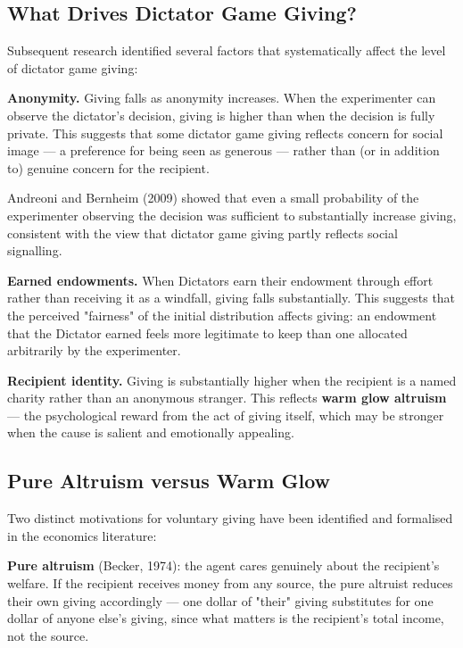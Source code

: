 \documentclass[12pt, letterpaper]{article}
\begin{document}
\newpage
\subsection{What Drives Dictator Game Giving?}


Subsequent research identified several factors that systematically affect the level of dictator game giving:

\textbf{Anonymity.} Giving falls as anonymity increases. When the experimenter can observe the dictator's decision, giving is higher than when the decision is fully private. This suggests that some dictator game giving reflects concern for social image --- a preference for being seen as generous --- rather than (or in addition to) genuine concern for the recipient.

Andreoni and Bernheim (2009) showed that even a small probability of the experimenter observing the decision was sufficient to substantially increase giving, consistent with the view that dictator game giving partly reflects social signalling.

\textbf{Earned endowments.} When Dictators earn their endowment through effort rather than receiving it as a windfall, giving falls substantially. This suggests that the perceived "fairness" of the initial distribution affects giving: an endowment that the Dictator earned feels more legitimate to keep than one allocated arbitrarily by the experimenter.

\textbf{Recipient identity.} Giving is substantially higher when the recipient is a named charity rather than an anonymous stranger. This reflects \textbf{warm glow altruism} --- the psychological reward from the act of giving itself, which may be stronger when the cause is salient and emotionally appealing.


\subsection{Pure Altruism versus Warm Glow}


Two distinct motivations for voluntary giving have been identified and formalised in the economics literature:

\textbf{Pure altruism} (Becker, 1974): the agent cares genuinely about the recipient's welfare. If the recipient receives money from any source, the pure altruist reduces their own giving accordingly --- one dollar of "their" giving substitutes for one dollar of anyone else's giving, since what matters is the recipient's total income, not the source.
\end{document}
